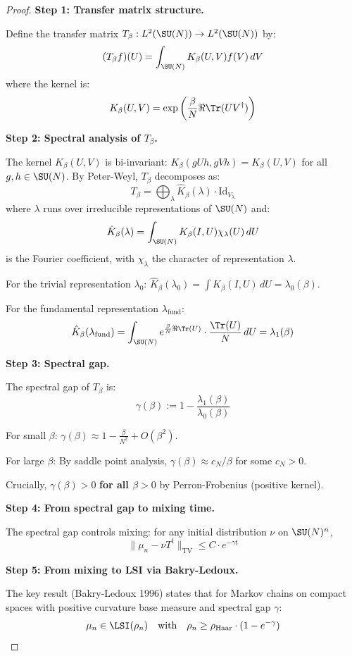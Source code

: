 \begin{proof}
\textbf{Step 1: Transfer matrix structure.}

Define the transfer matrix $T_\beta: L^2(\SU(N)) \to L^2(\SU(N))$ by:
\[
(T_\beta f)(U) = \int_{\SU(N)} K_\beta(U, V) f(V) \, dV
\]
where the kernel is:
\[
K_\beta(U, V) = \exp\left(\frac{\beta}{N} \Re\Tr(UV^\dagger)\right)
\]

\textbf{Step 2: Spectral analysis of $T_\beta$.}

The kernel $K_\beta(U, V)$ is bi-invariant: $K_\beta(gUh, gVh) = K_\beta(U, V)$ for all 
$g, h \in \SU(N)$. By Peter-Weyl, $T_\beta$ decomposes as:
\[
T_\beta = \bigoplus_{\lambda} \hat{K}_\beta(\lambda) \cdot \mathrm{Id}_{V_\lambda}
\]
where $\lambda$ runs over irreducible representations of $\SU(N)$ and:
\[
\hat{K}_\beta(\lambda) = \int_{\SU(N)} K_\beta(I, U) \chi_\lambda(U) \, dU
\]
is the Fourier coefficient, with $\chi_\lambda$ the character of representation $\lambda$.

For the trivial representation $\lambda_0$: $\hat{K}_\beta(\lambda_0) = \int K_\beta(I, U) \, dU = \lambda_0(\beta)$.

For the fundamental representation $\lambda_{\mathrm{fund}}$:
\[
\hat{K}_\beta(\lambda_{\mathrm{fund}}) = \int_{\SU(N)} e^{\frac{\beta}{N}\Re\Tr(U)} \cdot \frac{\Tr(U)}{N} \, dU = \lambda_1(\beta)
\]

\textbf{Step 3: Spectral gap.}

The spectral gap of $T_\beta$ is:
\[
\gamma(\beta) := 1 - \frac{\lambda_1(\beta)}{\lambda_0(\beta)}
\]

For small $\beta$: $\gamma(\beta) \approx 1 - \frac{\beta}{N^2} + O(\beta^2)$.

For large $\beta$: By saddle point analysis, $\gamma(\beta) \approx c_N/\beta$ for some $c_N > 0$.

Crucially, $\gamma(\beta) > 0$ \textbf{for all $\beta > 0$} by Perron-Frobenius (positive kernel).

\textbf{Step 4: From spectral gap to mixing time.}

The spectral gap controls mixing: for any initial distribution $\nu$ on $\SU(N)^n$,
\[
\|\mu_n - \nu T^t\|_{\mathrm{TV}} \leq C \cdot e^{-\gamma t}
\]

\textbf{Step 5: From mixing to LSI via Bakry-Ledoux.}

The key result (Bakry-Ledoux 1996) states that for Markov chains on compact spaces 
with positive curvature base measure and spectral gap $\gamma$:
\[
\mu_n \in \LSI(\rho_n) \quad \text{with} \quad \rho_n \geq \rho_{\mathrm{Haar}} \cdot (1 - e^{-\gamma})
\]


\end{proof}
